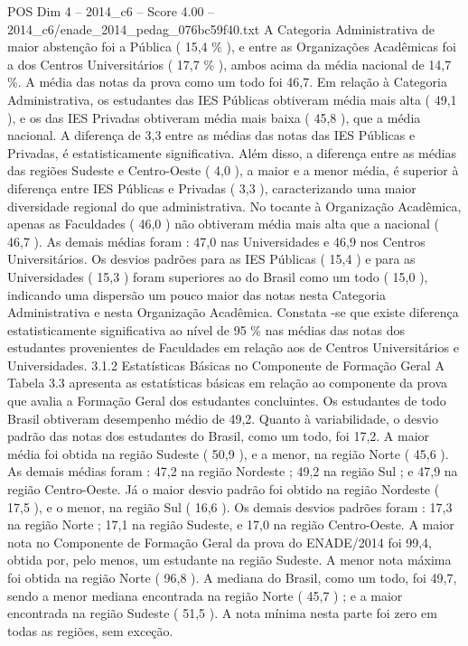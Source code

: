 \begin{textsample}{POS Dim 4 – 2014\_c6 – Score 4.00 – 2014\_c6/enade\_2014\_pedag\_076bc59f40.txt}
A Categoria Administrativa de maior abstenção foi a Pública ( 15,4 \% ), e entre as Organizações Acadêmicas foi a dos Centros Universitários ( 17,7 \% ), ambos acima da média nacional de 14,7 \%.
A média das notas da prova como um todo foi 46,7.
Em relação à Categoria Administrativa, os estudantes das IES Públicas obtiveram média mais alta ( 49,1 ), e os das IES Privadas obtiveram média mais baixa ( 45,8 ), que a média nacional.
A diferença de 3,3 entre as médias das notas das IES Públicas e Privadas, é estatisticamente significativa.
Além disso, a diferença entre as médias das regiões Sudeste e Centro-Oeste ( 4,0 ), a maior e a menor média, é superior à diferença entre IES Públicas e Privadas ( 3,3 ), caracterizando uma maior diversidade regional do que administrativa.
No tocante à Organização Acadêmica, apenas as Faculdades ( 46,0 ) não obtiveram média mais alta que a nacional ( 46,7 ).
As demais médias foram : 47,0 nas Universidades e 46,9 nos Centros Universitários.
Os desvios padrões para as IES Públicas ( 15,4 ) e para as Universidades ( 15,3 ) foram superiores ao do Brasil como um todo ( 15,0 ), indicando uma dispersão um pouco maior das notas nesta Categoria Administrativa e nesta Organização Acadêmica.
Constata -se que existe diferença estatisticamente significativa ao nível de 95 \% nas médias das notas dos estudantes provenientes de Faculdades em relação aos de Centros Universitários e Universidades. 3.1.2 Estatísticas Básicas no Componente de Formação Geral A Tabela 3.3 apresenta as estatísticas básicas em relação ao componente da prova que avalia a Formação Geral dos estudantes concluintes.
Os estudantes de todo Brasil obtiveram desempenho médio de 49,2.
Quanto à variabilidade, o desvio padrão das notas dos estudantes do Brasil, como um todo, foi 17,2.
A maior média foi obtida na região Sudeste ( 50,9 ), e a menor, na região Norte ( 45,6 ).
As demais médias foram : 47,2 na região Nordeste ; 49,2 na região Sul ; e 47,9 na região Centro-Oeste.
Já o maior desvio padrão foi obtido na região Nordeste ( 17,5 ), e o menor, na região Sul ( 16,6 ).
Os demais desvios padrões foram : 17,3 na região Norte ; 17,1 na região Sudeste, e 17,0 na região Centro-Oeste.
A maior nota no Componente de Formação Geral da prova do ENADE/2014 foi 99,4, obtida por, pelo menos, um estudante na região Sudeste.
A menor nota máxima foi obtida na região Norte ( 96,8 ).
A mediana do Brasil, como um todo, foi 49,7, sendo a menor mediana encontrada na região Norte ( 45,7 ) ; e a maior encontrada na região Sudeste ( 51,5 ).
A nota mínima nesta parte foi zero em todas as regiões, sem exceção.

\end{textsample}
